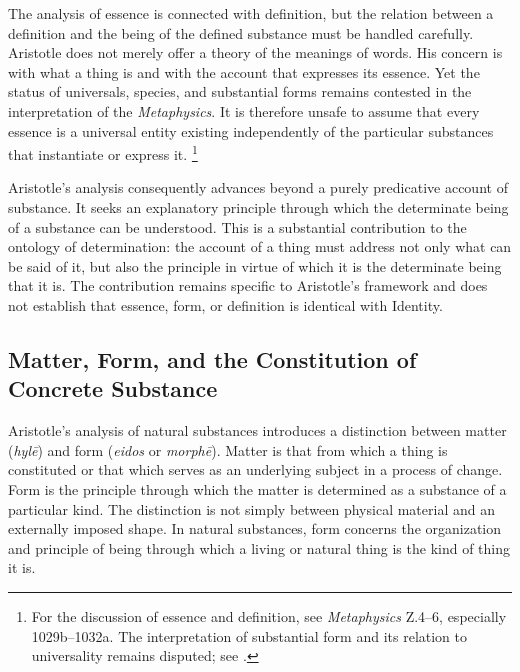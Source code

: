 The analysis of essence is connected with definition,
but the relation between a definition and the being
of the defined substance must be handled carefully.
Aristotle does not merely offer a theory of the meanings
of words. His concern is with what a thing is and
with the account that expresses its essence. Yet the
status of universals, species, and substantial forms
remains contested in the interpretation of the
\textit{Metaphysics}. It is therefore unsafe to assume
that every essence is a universal entity existing
independently of the particular substances that
instantiate or express it. \footnote{For the discussion
of essence and definition, see \textit{Metaphysics}
Z.4--6, especially 1029b--1032a. The interpretation
of substantial form and its relation to universality
remains disputed; see \cite{CohenReeveAristotleMetaphysics2025}.}

\label{para:VS.B01.P01.C08.S05.SS04.P005}

Aristotle's analysis consequently advances beyond
a purely predicative account of substance. It seeks
an explanatory principle through which the determinate
being of a substance can be understood. This is a
substantial contribution to the ontology of determination:
the account of a thing must address not only what
can be said of it, but also the principle in virtue
of which it is the determinate being that it is.
The contribution remains specific to Aristotle's
framework and does not establish that essence,
form, or definition is identical with Identity.


\subsection{Matter, Form, and the Constitution of Concrete Substance}

\label{para:VS.B01.P01.C08.S05.SS05.P001}

Aristotle's analysis of natural substances introduces
a distinction between matter (\textit{hylē}) and form
(\textit{eidos} or \textit{morphē}). Matter is that
from which a thing is constituted or that which serves
as an underlying subject in a process of change.
Form is the principle through which the matter is
determined as a substance of a particular kind.
The distinction is not simply between physical
material and an externally imposed shape. In natural
substances, form concerns the organization and
principle of being through which a living or natural
thing is the kind of thing it is. \cite{AristotlePhysics,
AristotleMetaphysics}

